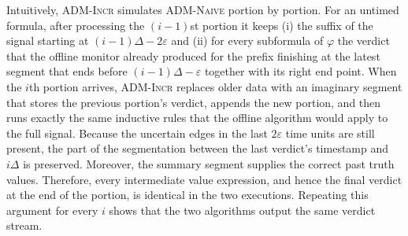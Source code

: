 
Intuitively, \textsc{ADM-Incr} simulates \textsc{ADM-Naive} portion by portion.
For an untimed formula, after processing the $(i-1)$st portion it keeps (i) the suffix of the signal starting at $(i-1)\Delta - 2\varepsilon$ and (ii) for every subformula of $\varphi$ the verdict that the offline monitor already produced for the prefix finishing at the latest segment that ends before $(i-1)\Delta - \varepsilon$ together with its right end point.
When the $i$th portion arrives, \textsc{ADM-Incr} replaces older data with an imaginary segment that stores the previous portion's verdict, appends the new portion, and then runs exactly the same inductive rules that the offline algorithm would apply to the full signal.
Because the uncertain edges in the last $2\varepsilon$ time units are still present, the part of the segmentation between the last verdict's timestamp and $i\Delta$ is preserved.
Moreover, the summary segment supplies the correct past truth values.
Therefore, every intermediate value expression, and hence the final verdict at the end of the portion, is identical in the two executions.
Repeating this argument for every $i$ shows that the two algorithms output the same verdict stream.

